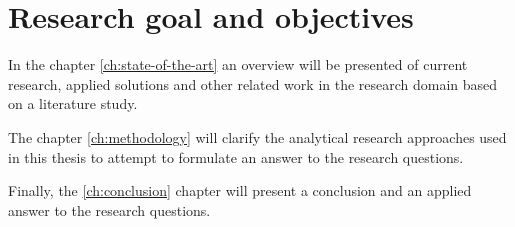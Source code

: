 
\section{Research goal and objectives}
\label{sec:research-goal-and-objectives}


\clearpage{}

In the chapter \autoref{ch:state-of-the-art} an overview will be presented of current research, applied solutions and other related work in the research domain based on a literature study.

The chapter \ref{ch:methodology} will clarify the analytical research approaches used in this thesis to attempt to formulate an answer to the research questions.

Finally, the \ref{ch:conclusion} chapter will present a conclusion and an applied answer to the research questions.
